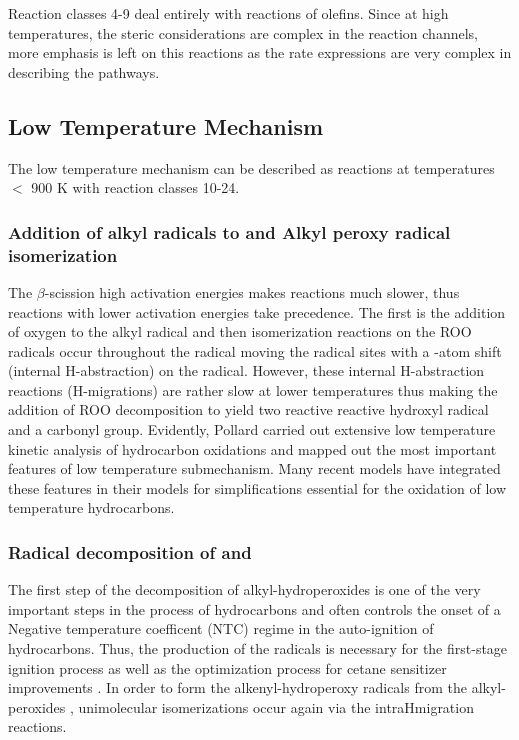 Reaction classes 4-9 deal entirely with reactions of olefins. Since at high temperatures, the steric considerations are complex in the reaction channels, more emphasis is left on this reactions as the rate expressions are very complex in describing the pathways.
\newpage
\subsection{Low Temperature Mechanism}
The low temperature mechanism can be described as reactions at temperatures $<$ 900 K with reaction classes 10-24.

\subsubsection{Addition of alkyl radicals to  and Alkyl peroxy radical isomerization }

The $\beta$-scission high activation energies makes reactions much slower, thus reactions with lower activation energies take precedence. The first is the addition of oxygen  to the alkyl radical and then isomerization reactions on the ROO radicals occur throughout the radical moving the radical sites with a -atom shift (internal H-abstraction) on the radical. 
 However, these internal H-abstraction reactions (H-migrations) are rather slow at lower temperatures thus making the addition of ROO decomposition to yield two reactive reactive hydroxyl radical and a carbonyl group. Evidently, Pollard \cite{Pollard1977Hydrocarbons} carried out extensive low temperature kinetic analysis of hydrocarbon oxidations and mapped out the most important features of low temperature submechanism. Many recent models have integrated these features in their models for simplifications essential for the oxidation of low temperature hydrocarbons. 



\subsubsection{Radical decomposition of  and  }
The first step of the decomposition of  alkyl-hydroperoxides is one of the very important steps in the process of hydrocarbons and often controls the onset of a Negative temperature coefficent (NTC) regime in the auto-ignition of hydrocarbons. Thus, the production of the  radicals is necessary for the first-stage ignition process \cite{Merchant2015UnderstandingPropane} as well as the optimization process for cetane sensitizer improvements \cite{Curran1998AOxidation}. In order to form the alkenyl-hydroperoxy radicals  from the alkyl-peroxides , unimolecular isomerizations occur again via the intra\textunderscore H\textunderscore migration reactions. 

